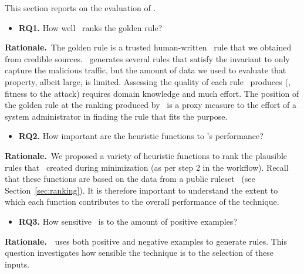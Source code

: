 \documentclass[sigconf,review, anonymous]{acmart}
\begin{document}
This section reports on the evaluation of \tname{}.


\newcommand{\textRQone}{How well \tname\ ranks the golden rule?}
\begin{itemize}[leftmargin=*,label={}]
\item{\textbf{RQ1.}} \textRQone
\end{itemize}

\noindent
\textbf{Rationale.}~The golden rule is a trusted human-written
\nids\ rule that we obtained from credible sources. \tname\ generates
several rules that satisfy the invariant to only capture the malicious
traffic, but the amount of data we used to evaluate that property,
albeit large, is limited. Assessing the quality of each rule
\tname\ produces (\ie{}, fitness to the attack) requires domain
knowledge and much effort. The position of the golden rule at the
ranking produced by \tname\ is a proxy measure to the effort of a
system administrator in finding the rule that fits the purpose.


\newcommand{\textRQtwo}{How important are the heuristic functions
  to \tname's performance?}
\begin{itemize}[leftmargin=*,label={}]
\item{\textbf{RQ2.}} \textRQtwo\
\end{itemize}

\noindent
\textbf{Rationale.}~We proposed a variety of heuristic functions to
rank the plausible rules that \tname\ created during minimization (as
per step 2 in the workflow). Recall that these functions are based on
the data from a public ruleset~\cite{emerging-threats-open} (see
Section~\ref{sec:ranking}). It is therefore important to understand
the extent to which each function contributes to the overall
performance of the technique.

\newcommand{\textRQthree}{How sensitive \tname\ is to the amount of
  positive examples?}
\begin{itemize}[leftmargin=*,label={}]
\item{\textbf{RQ3.}} \textRQthree\
\end{itemize}

\noindent
\textbf{Rationale.}~\tname\ uses both positive and negative examples
to generate rules. This question investigates how sensible the
technique is to the selection of these inputs.
\noindent
\vspace{1ex}
\end{document}
